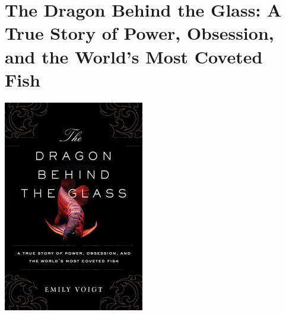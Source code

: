 \documentclass{tufte-handout}
\makeatletter
\newcommand{\varcaption}[2][0pt]{%
  \gsetlength{\@tufte@caption@vertical@offset}{-#1}%
  \gdef\@tufte@stored@varcaption{#2}%
}
\gdef\@tufte@stored@varcaption{} %
\makeatother
\begin{document}
\section*{The Dragon Behind the Glass: A True Story of Power, Obsession, and the World's Most Coveted Fish}
\begin{marginfigure}[10\baselineskip]
   \includegraphics[width=\linewidth]{images/dragon_behind_the_glass.jpg}
   \varcaption{\href{https://www.simonandschuster.com/books/The-Dragon-Behind-the-Glass/Emily-Voigt/9781451678949}{Publisher Link}, \href{https://www.amazon.com/Dragon-Behind-Glass-Obsession-Coveted/dp/1451678959/}{Amazon Link}}
\end{marginfigure}
\end{document}
